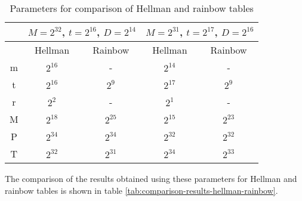 \begin{table}[ht!]
\begin{center}
\caption{Parameters for comparison of Hellman and rainbow tables}
\begin{tabular}{|c|c c||c c|}
\hline
			& \multicolumn{2}{c||}{$M = 2^{32}$, $t = 2^{16}$, $D = 2^{14}$} 	& \multicolumn{2}{c|}{$M = 2^{31}$, $t = 2^{17}$, $D = 2^{16}$}	\\ \hline \hline
			&	Hellman				&	Rainbow					&	Hellman					& Rainbow				\\ \hline \hline
m			&	$2^{16}$			&		-							&	$2^{14}$				& 	-						\\ \hline 
t			&	$2^{16}$			&	$2^{9}$					&	$2^{17}$				& $2^{9}$				\\ \hline 
r			&	$2^{2}$				&		-							&	$2^{1}$					& 	-						\\ \hline 
M			&	$2^{18}$			&	$2^{25}$				&	$2^{15}$				& $2^{23}$			\\ \hline 
P			&	$2^{34}$			&	$2^{34}$				&	$2^{32}$				& $2^{32}$			\\ \hline 
T			&	$2^{32}$			&	$2^{31}$				&	$2^{34}$				& $2^{33}$			\\ \hline 
\end{tabular}
\end{center} 
\label{tab:parameters-comparison}
\end{table}

The comparison of the results obtained using these parameters for Hellman and rainbow tables is shown in table \ref{tab:comparison-results-hellman-rainbow}. 

